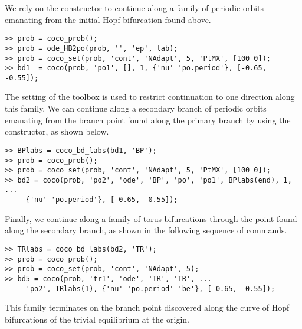 We rely on the  constructor to continue along a family of periodic orbits emanating from the initial Hopf bifurcation found above.
\begin{lstlisting}[language=coco-highlight]
>> prob = coco_prob();
>> prob = ode_HB2po(prob, '', 'ep', lab);
>> prob = coco_set(prob, 'cont', 'NAdapt', 5, 'PtMX', [100 0]);
>> bd1  = coco(prob, 'po1', [], 1, {'nu' 'po.period'}, [-0.65, -0.55]);
\end{lstlisting}
The  setting of the  toolbox is used to restrict continuation to one direction along this family. We can continue along a secondary branch of periodic orbits emanating from the branch point found along the primary branch by using the  constructor, as shown below.
\begin{lstlisting}[language=coco-highlight]
>> BPlabs = coco_bd_labs(bd1, 'BP');
>> prob = coco_prob();
>> prob = coco_set(prob, 'cont', 'NAdapt', 5, 'PtMX', [100 0]);
>> bd2 = coco(prob, 'po2', 'ode', 'BP', 'po', 'po1', BPlabs(end), 1, ...
     {'nu' 'po.period'}, [-0.65, -0.55]);
\end{lstlisting}
Finally, we continue along a family of torus bifurcations through the point found along the secondary branch, as shown in the following sequence of commands.
\begin{lstlisting}[language=coco-highlight]
>> TRlabs = coco_bd_labs(bd2, 'TR');
>> prob = coco_prob();
>> prob = coco_set(prob, 'cont', 'NAdapt', 5);
>> bd5 = coco(prob, 'tr1', 'ode', 'TR', 'TR', ...
     'po2', TRlabs(1), {'nu' 'po.period' 'be'}, [-0.65, -0.55]);
\end{lstlisting}
This family terminates on the branch point discovered along the curve of Hopf bifurcations of the trivial equilibrium at the origin.\\
\medskip

